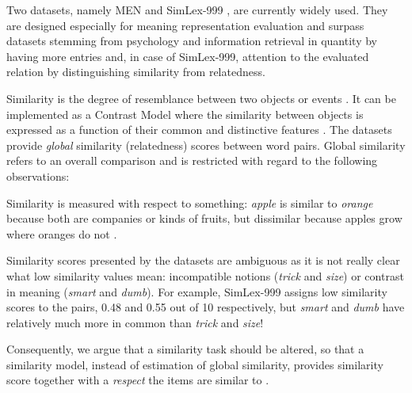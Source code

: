 \documentclass[11pt]{article}
\begin{document}
Two datasets, namely MEN \cite{Bruni:2012:DST:2390524.2390544} and SimLex-999 \cite{hill2014simlex}, are currently widely used. They are designed especially for meaning representation evaluation and surpass datasets stemming from psychology \cite{1986-13502-00119860101} and information retrieval \cite{2002:PSC:503104.503110} in quantity by having more entries and, in case of SimLex-999, attention to the evaluated relation by distinguishing similarity from relatedness.

Similarity is the degree of resemblance between two objects or events \cite{WCS:WCS1282}. It can be implemented as a Contrast Model where the similarity between objects is expressed as a function of their common and distinctive features \cite{Tversky1977}. The datasets provide \emph{global} similarity (relatedness) scores between word pairs. Global similarity refers to an overall comparison \cite{hahn1997concepts} and is restricted with regard to the following observations:
\begin{compactitem}
    \item Similarity is measured with respect to something: \textit{apple} is similar to \textit{orange} because both are companies or kinds of fruits, but dissimilar because apples grow where oranges do not \cite{hahn1997concepts}.
    \item Similarity scores presented by the datasets are ambiguous as it is not really clear what low similarity values mean: incompatible notions (\textit{trick} and \textit{size}) or contrast in meaning (\textit{smart} and \textit{dumb}). For example, SimLex-999 assigns low similarity scores to the pairs, 0.48 and 0.55 out of 10 respectively, but \textit{smart} and \textit{dumb} have relatively much more in common than \textit{trick} and \textit{size}!

\end{compactitem}
%
Consequently, we argue that a similarity task should be altered, so that a similarity model, instead of estimation of global similarity, provides similarity score together with a \emph{respect} the items are similar to \cite{hahn1997concepts}.
\end{document}
